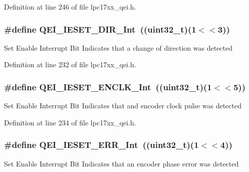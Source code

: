 \-Definition at line 246 of file lpc17xx\-\_\-qei.\-h.

\hypertarget{group___q_e_i___private___macros_gacba10cdadb9de0d7663ceff001723155}{
\subsubsection[{\-Q\-E\-I\-\_\-\-I\-E\-S\-E\-T\-\_\-\-D\-I\-R\-\_\-\-Int}]{\setlength{\rightskip}{0pt plus 5cm}\#define {\bf \-Q\-E\-I\-\_\-\-I\-E\-S\-E\-T\-\_\-\-D\-I\-R\-\_\-\-Int}~((uint32\-\_\-t)(1$<$$<$3))}}\label{group___q_e_i___private___macros_gacba10cdadb9de0d7663ceff001723155}
\-Set \-Enable \-Interrupt \-Bit \-Indicates that a change of direction was detected 

\-Definition at line 232 of file lpc17xx\-\_\-qei.\-h.

\hypertarget{group___q_e_i___private___macros_ga090b28a6772645b95c8ce125ad28191f}{
\subsubsection[{\-Q\-E\-I\-\_\-\-I\-E\-S\-E\-T\-\_\-\-E\-N\-C\-L\-K\-\_\-\-Int}]{\setlength{\rightskip}{0pt plus 5cm}\#define {\bf \-Q\-E\-I\-\_\-\-I\-E\-S\-E\-T\-\_\-\-E\-N\-C\-L\-K\-\_\-\-Int}~((uint32\-\_\-t)(1$<$$<$5))}}\label{group___q_e_i___private___macros_ga090b28a6772645b95c8ce125ad28191f}
\-Set \-Enable \-Interrupt \-Bit \-Indicates that and encoder clock pulse was detected 

\-Definition at line 234 of file lpc17xx\-\_\-qei.\-h.

\hypertarget{group___q_e_i___private___macros_ga25306b572a3dff74e158a7ea144927b0}{
\subsubsection[{\-Q\-E\-I\-\_\-\-I\-E\-S\-E\-T\-\_\-\-E\-R\-R\-\_\-\-Int}]{\setlength{\rightskip}{0pt plus 5cm}\#define {\bf \-Q\-E\-I\-\_\-\-I\-E\-S\-E\-T\-\_\-\-E\-R\-R\-\_\-\-Int}~((uint32\-\_\-t)(1$<$$<$4))}}\label{group___q_e_i___private___macros_ga25306b572a3dff74e158a7ea144927b0}
\-Set \-Enable \-Interrupt \-Bit \-Indicates that an encoder phase error was detected 

